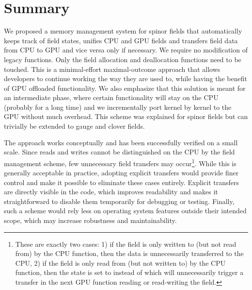 \section{Summary}
\label{sec:mm:summary}

We proposed a memory management system for spinor fields that automatically keeps track of field states, unifies CPU and GPU fields and transfers field data from CPU to GPU and vice versa only if necessary.
We require no modification of legacy \openqxd functions.
Only the field allocation and deallocation functions need to be touched.
This is a minimal-effort maximal-outcome approach that allows \openqxd developers to continue working the way they are used to, while having the benefit of GPU offloaded functionality.
We also emphasize that this solution is meant for an intermediate phase, where certain functionality will stay on the CPU (probably for a long time) and we incrementally port kernel by kernel to the GPU without much overhead.
This scheme was explained for spinor fields but can trivially be extended to gauge and clover fields.

The approach works conceptually and has been successfully verified on a small scale.
Since reads and writes cannot be distinguished on the CPU by the field management scheme, few unnecessary field transfers may occur\footnote{These are exactly two cases: 1) if the field is only written to (but not read from) by the CPU function, then the data is unnecessarily transferred to the CPU, 2) if the field is only read from (but not written to) by the CPU function, then the state is set to  instead of  which will unnecessarily trigger a transfer in the next GPU function reading or read-writing the field.}.
While this is generally acceptable in practice, adopting explicit transfers would provide finer control and make it possible to eliminate these cases entirely.
Explicit transfers are directly visible in the code, which improves readability and makes it straightforward to disable them temporarily for debugging or testing.
Finally, such a scheme would rely less on operating system features outside their intended scope, which may increase robustness and maintainability.

